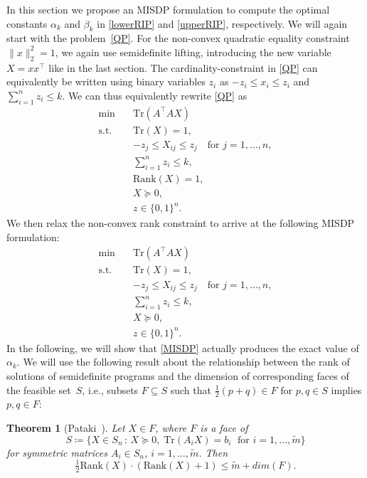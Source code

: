 \documentclass[journal]{IEEEtran}
\newtheorem{theorem}{Theorem}
\newcommand{\suchthat}{\,:\,}
\newcommand{\define}{\coloneqq}
\newcommand{\Norm}[2]{\lVert{#1}\rVert_{#2}}
\newcommand{\T}{^{\top}}
\newcommand{\Tr}{\text{Tr}}
\newcommand{\Rk}{\text{Rank}}
\begin{document}
\noindent
In this section we propose an MISDP formulation to compute the optimal
constants $\alpha_k$ and $\beta_k$ in \eqref{lowerRIP} and
\eqref{upperRIP}, respectively. We will again start with the problem~\eqref{QP}.
For the non-convex quadratic equality constraint $\Norm{x}{2}^2 = 1$, we
again use semidefinite lifting, introducing the new variable $X=xx\T$ like in the last section. 
The cardinality-constraint in \eqref{QP} can equivalently be written using
binary variables $z_i$ as $-z_i \leq x_i \leq z_i$ and $\sum_{i=1}^n z_i
\leq k$. We can thus equivalently rewrite \eqref{QP} as
\begin{equation}\label{Rk1MISDP}
 \begin{aligned}
  \min \quad & \Tr(A\T A X) \\
  \text{s.t.} \quad & \Tr(X) = 1, \\
  & -z_j \leq X_{ij} \leq z_j \quad \text{for } j = 1, \dots, n, \\
  & \sum_{i=1}^n z_i \leq k,\\
  & \Rk(X) = 1, \\
  & X \succeq 0, \\
  & z \in \{0,1\}^n.
 \end{aligned}
\end{equation}
We then relax the non-convex rank constraint to arrive at the following
MISDP formulation:
\begin{equation}\label{MISDP}\tag{MISDP}
 \begin{aligned}
  \min \quad & \Tr(A\T A X) \\
  \text{s.t.} \quad & \Tr(X) = 1, \\
  & -z_j \leq X_{ij} \leq z_j \quad \text{for } j = 1, \dots, n, \\
  & \sum_{i=1}^n z_i \leq k, \\
  & X \succeq 0, \\
  & z \in \{0,1\}^n.
 \end{aligned}
\end{equation}
In the following, we will show that \eqref{MISDP} actually produces the
exact value of $\alpha_k$. We will use the following result about the
relationship between the rank of solutions of semidefinite programs and the
dimension of corresponding faces of the feasible set~$S$, i.e., subsets $F
\subseteq S$ such that $\tfrac{1}{2} (p + q) \in F$ for $p, q \in S$ implies
$p,q \in F$:

\begin{theorem}[Pataki~\cite{pat98}]\label{patakiLemma}
  Let $X \in F$, where $F$ is a face of
  \begin{equation*}
    S \define \{X \in S_n \suchthat X \succeq 0,\; \Tr(A_i X) = b_i\; \text{ for } i = 1, \dots, \tilde{m}\}
  \end{equation*}
  for symmetric matrices $A_i \in S_n$, $i = 1, \dots, \tilde{m}$. Then
  \begin{equation*}
    \tfrac{1}{2}\Rk(X)\cdot(\Rk(X)+1) \leq \tilde{m} + dim(F).
  \end{equation*}
\end{theorem}
\end{document}
